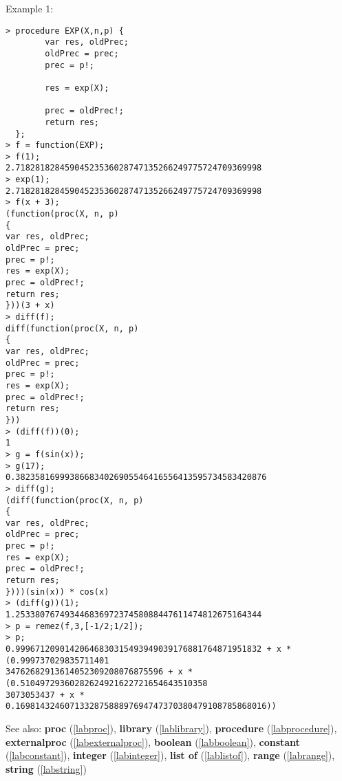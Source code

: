 \noindent Example 1: 
\begin{center}\begin{minipage}{15cm}\begin{Verbatim}[frame=single]
> procedure EXP(X,n,p) {
        var res, oldPrec;
        oldPrec = prec;
        prec = p!;
        
        res = exp(X);
        
        prec = oldPrec!;
        return res;
  };
> f = function(EXP);
> f(1);
2.71828182845904523536028747135266249775724709369998
> exp(1);
2.71828182845904523536028747135266249775724709369998
> f(x + 3);
(function(proc(X, n, p)
{
var res, oldPrec;
oldPrec = prec;
prec = p!;
res = exp(X);
prec = oldPrec!;
return res;
}))(3 + x)
> diff(f);
diff(function(proc(X, n, p)
{
var res, oldPrec;
oldPrec = prec;
prec = p!;
res = exp(X);
prec = oldPrec!;
return res;
}))
> (diff(f))(0);
1
> g = f(sin(x));
> g(17);
0.382358169993866834026905546416556413595734583420876
> diff(g);
(diff(function(proc(X, n, p)
{
var res, oldPrec;
oldPrec = prec;
prec = p!;
res = exp(X);
prec = oldPrec!;
return res;
})))(sin(x)) * cos(x)
> (diff(g))(1);
1.25338076749344683697237458088447611474812675164344
> p = remez(f,3,[-1/2;1/2]);
> p;
0.99967120901420646830315493949039176881764871951832 + x * (0.999737029835711401
34762682913614052309208076875596 + x * (0.51049729360282624921622721654643510358
3073053437 + x * 0.169814324607133287588897694747370380479108785868016))
\end{Verbatim}
\end{minipage}\end{center}
See also: \textbf{proc} (\ref{labproc}), \textbf{library} (\ref{lablibrary}), \textbf{procedure} (\ref{labprocedure}), \textbf{externalproc} (\ref{labexternalproc}), \textbf{boolean} (\ref{labboolean}), \textbf{constant} (\ref{labconstant}), \textbf{integer} (\ref{labinteger}), \textbf{list of} (\ref{lablistof}), \textbf{range} (\ref{labrange}), \textbf{string} (\ref{labstring})
